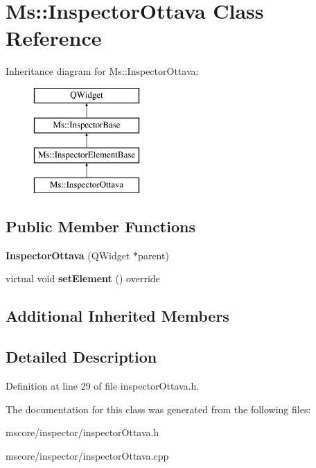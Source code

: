 \hypertarget{class_ms_1_1_inspector_ottava}{}\section{Ms\+:\+:Inspector\+Ottava Class Reference}
\label{class_ms_1_1_inspector_ottava}
Inheritance diagram for Ms\+:\+:Inspector\+Ottava\+:\begin{figure}[H]
\begin{center}
\leavevmode
\includegraphics[height=4.000000cm]{class_ms_1_1_inspector_ottava}
\end{center}
\end{figure}
\subsection*{Public Member Functions}
\begin{DoxyCompactItemize}
\item 
\mbox{\label{class_ms_1_1_inspector_ottava_a2c85f0aeffc176f651bda7c5d8b472b6}} 
{\bfseries Inspector\+Ottava} (Q\+Widget $\ast$parent)
\item 
\mbox{\label{class_ms_1_1_inspector_ottava_a815c5405ee3a52873875c0f00c12713a}} 
virtual void {\bfseries set\+Element} () override
\end{DoxyCompactItemize}
\subsection*{Additional Inherited Members}


\subsection{Detailed Description}


Definition at line 29 of file inspector\+Ottava.\+h.



The documentation for this class was generated from the following files\+:\begin{DoxyCompactItemize}
\item 
mscore/inspector/inspector\+Ottava.\+h\item 
mscore/inspector/inspector\+Ottava.\+cpp\end{DoxyCompactItemize}
